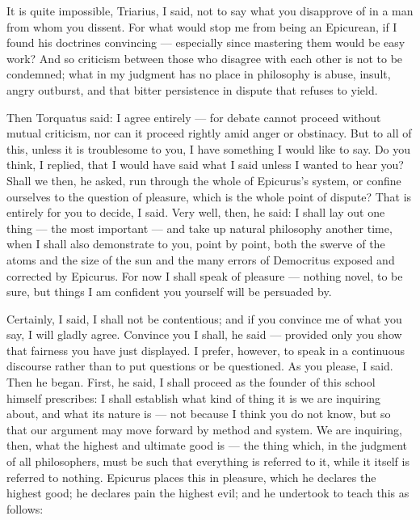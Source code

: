  It is quite impossible, Triarius, I said, not to say what you disapprove of in a man from whom you dissent. For what would stop me from being an Epicurean, if I found his doctrines convincing — especially since mastering them would be easy work? And so criticism between those who disagree with each other is not to be condemned; what in my judgment has no place in philosophy is abuse, insult, angry outburst, and that bitter persistence in dispute that refuses to yield.

 Then Torquatus said: I agree entirely — for debate cannot proceed without mutual criticism, nor can it proceed rightly amid anger or obstinacy. But to all of this, unless it is troublesome to you, I have something I would like to say. Do you think, I replied, that I would have said what I said unless I wanted to hear you? Shall we then, he asked, run through the whole of Epicurus's system, or confine ourselves to the question of pleasure, which is the whole point of dispute? That is entirely for you to decide, I said. Very well, then, he said: I shall lay out one thing — the most important — and take up natural philosophy another time, when I shall also demonstrate to you, point by point, both the swerve of the atoms and the size of the sun and the many errors of Democritus exposed and corrected by Epicurus. For now I shall speak of pleasure — nothing novel, to be sure, but things I am confident you yourself will be persuaded by.

 Certainly, I said, I shall not be contentious; and if you convince me of what you say, I will gladly agree. Convince you I shall, he said — provided only you show that fairness you have just displayed. I prefer, however, to speak in a continuous discourse rather than to put questions or be questioned. As you please, I said. Then he began. First, he said, I shall proceed as the founder of this school himself prescribes: I shall establish what kind of thing it is we are inquiring about, and what its nature is — not because I think you do not know, but so that our argument may move forward by method and system. We are inquiring, then, what the highest and ultimate good is — the thing which, in the judgment of all philosophers, must be such that everything is referred to it, while it itself is referred to nothing. Epicurus places this in pleasure, which he declares the highest good; he declares pain the highest evil; and he undertook to teach this as follows:

